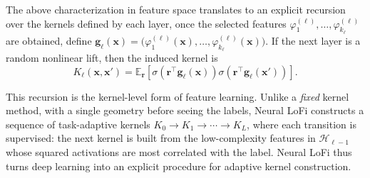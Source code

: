 The above characterization in feature space translates to an explicit recursion over the kernels defined by each layer, once the selected features
$
    \varphi_1^{(\ell)},\dots,\varphi_{k_\ell}^{(\ell)}
$ are obtained, define
$
    \bm g_\ell(\bm x)
    =
    \big(
    \varphi_1^{(\ell)}(\bm x),\dots,\varphi_{k_\ell}^{(\ell)}(\bm x)
    \big).
$
If the next layer is a random nonlinear lift, then the induced kernel is
\begin{equation}
    K_\ell(\bm x,\bm x')
    =
    \mathbb E_{\bm r}
    \left[
    \sigma(\bm r^\top \bm g_\ell(\bm x))
    \sigma(\bm r^\top \bm g_\ell(\bm x'))
    \right].
    \label{2605:eq:lofi-kernel-recursion}
\end{equation}

This recursion is the kernel-level form of feature learning. Unlike a {\it fixed} kernel method, with a single geometry before seeing the labels, Neural LoFi constructs a sequence of task-adaptive kernels
$K_0 \longrightarrow K_1 \longrightarrow \cdots \longrightarrow K_L$,
where each transition is supervised: the next kernel is built from the low-complexity features in \(\mathcal H_{\ell-1}\) whose squared activations are most correlated with the label.  Neural LoFi thus turns deep learning into an explicit procedure for adaptive kernel construction. %
